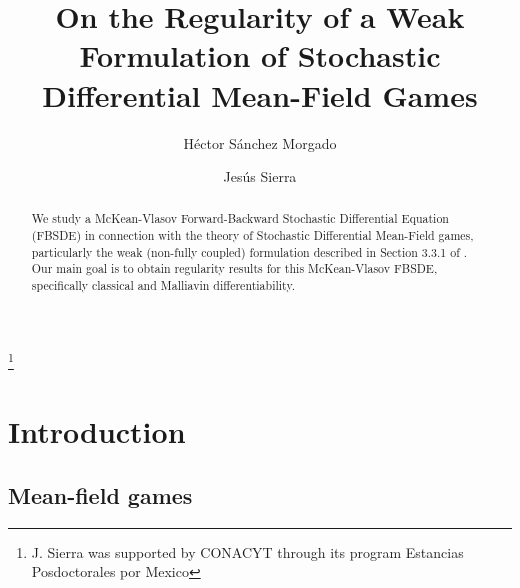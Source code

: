\documentclass[12,english]{amsart}
\theoremstyle{plain}
\theoremstyle{definition}
\theoremstyle{plain}
\theoremstyle{plain}
\theoremstyle{remark}
\begin{document}
\title[Regularity of weak formulation of MFG]
{On the Regularity of a Weak Formulation of Stochastic Differential Mean-Field Games}

\author[H. S\'anchez Morgado]{H\'ector S\'anchez Morgado}
\address{Instituto de Matem\'aticas, Universidad Nacional Aut\'onoma de M\'exico,
  Ciudad Universitaria CP 04510, Ciudad de M\'exico, M\'exico.}
\author[J. Sierra]{Jes\'us Sierra}
\address{Instituto de Matem\'aticas, Universidad Nacional Aut\'onoma de M\'exico,
  Ciudad Universitaria CP 04510, Ciudad de M\'exico, M\'exico.}

\begin{abstract}
We study a McKean-Vlasov Forward-Backward Stochastic Differential Equation (FBSDE) in connection with the theory of Stochastic Differential Mean-Field games, particularly the weak (non-fully coupled) formulation described in Section 3.3.1 of \cite{carmona2018probabilistic}. Our main goal is to obtain regularity results for this McKean-Vlasov FBSDE, specifically classical and Malliavin differentiability.
\end{abstract}
\thanks{J. Sierra was supported by CONACYT through its program Estancias Posdoctorales por Mexico}



\maketitle
\section{Introduction}
\label{sec:intro}

\subsection{Mean-field games}
\label{sec:mfg}
\end{document}
